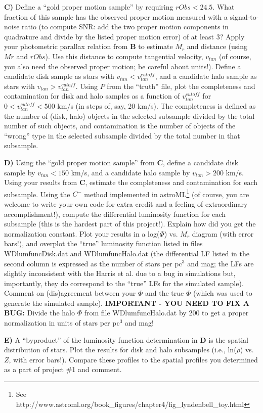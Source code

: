 {\bf C)} Define a ``gold proper motion sample'' by requiring $rObs < 24.5$. What fraction of
this sample has the observed proper motion measured with a signal-to-noise ratio (to compute
SNR: add the two proper motion components in quadrature and divide by the listed proper
motion error) of at least 3? Apply your photometric parallax relation from {\bf B} to estimate
$M_r$ and distance (using $Mr$ and $rObs$). Use this distance to compute tangential velocity,
$v_{tan}$ (of course, you also need the observed proper motion; be careful about units!). Define
a candidate disk sample as stars with $v_{tan}< v_{tan}^{cutoff}$, and a candidate halo sample as stars with
$v_{tan} > v_{tan}^{cutoff}$. Using $P$ from the “truth” file, plot the completeness and contamination 
for disk and halo samples as a function of $v_{tan}^{cutoff}$ for $0 < v_{tan}^{cutoff} < 500$ km/s (in steps 
of, say, 20 km/s). The completeness is defined as the number of (disk, halo) objects in the selected 
subsample divided by the total number of such objects, and contamination is the number of objects
 of the ``wrong'' type in the selected subsample divided by the total number in that subsample.

{\bf D)} Using the ``gold proper motion sample'' from {\bf C}, define a candidate disk sample by
$v_{tan} < 150$ km/s, and a candidate halo sample by $v_{tan} > 200$ km/s. Using your results 
from {\bf C}, estimate the completeness and contamination for each subsample. Using the 
$C^−$ method implemented in astroML\footnote{See
http://www.astroml.org/book\_figures/chapter4/fig\_lyndenbell\_toy.html} (of course, you
are welcome to write your own code for extra credit and a feeling of extraordinary accomplishment!), 
compute the differential luminosity function for each subsample (this is the hardest 
part of this project!). Explain how did you get the normalization constant. Plot your results in a
log($\Phi$) vs. $M_r$ diagram (with error bars!), and overplot the “true” luminosity function listed in 
files WDlumfuncDisk.dat and WDlumfuncHalo.dat (the differential LF listed in the second column is 
expressed as the number of stars per pc$^3$ and mag; the LFs are slightly inconsistent with the Harris 
et al. due to a bug in simulations but, importantly, they do correspond to the ``true'' LFs for the simulated 
sample). Comment on (dis)agreement between your $\Phi$ and the true $\Phi$ (which was used to generate 
the simulated sample). {\bf IMPORTANT - YOU NEED TO FIX A BUG:} Divide the halo $\Phi$ from file WDlumfuncHalo.dat 
by 200 to get a proper normalization in units of stars per pc$^3$ and mag! 

{\bf E)} A ``byproduct'' of the luminosity function determination in {\bf D} is the spatial distribution of stars. 
Plot the results for disk and halo subsamples (i.e., ln($\rho$) vs. $Z$, with error bars!). Compare these profiles
 to the spatial profiles you determined as a part of project \#1 and comment.




